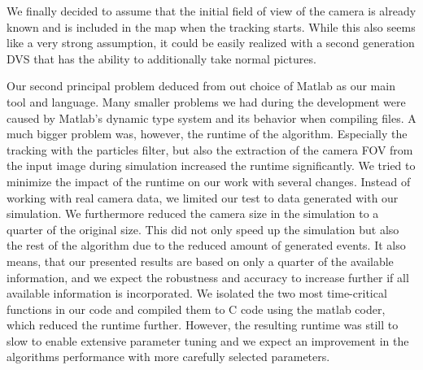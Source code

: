 We finally decided to assume that the initial field of view of the camera is already
known and is included in the map when the tracking starts. While this also seems like
a very strong assumption, it could be easily realized with a second generation DVS that
has the ability to additionally  take normal pictures.

Our second principal problem deduced from out choice of Matlab as our main tool and language.
Many smaller problems we had during the development were caused by Matlab's dynamic type system
and its behavior when compiling files.
A much bigger problem was, however, the runtime of the algorithm. Especially the tracking with
the particles filter, but also the extraction of the camera FOV from the input image during
simulation increased the runtime significantly.
We tried to minimize the impact of the runtime on our work with several changes.
Instead of working with real camera data, we limited our test to data generated with our simulation.
We furthermore reduced the camera size in the simulation to a quarter of the original size.
This did not only speed up the simulation but also the rest of the algorithm due to the
reduced amount of generated events. It also means, that our presented results are based on
only a quarter of the available information, and we expect the robustness and accuracy to
increase further if all available information is incorporated.
We isolated the two most time-critical functions in our code and compiled them to C code using
the matlab coder, which reduced the runtime further.
However, the resulting runtime was still to slow to enable extensive parameter tuning and
we expect an improvement in the algorithms performance with more carefully selected parameters.